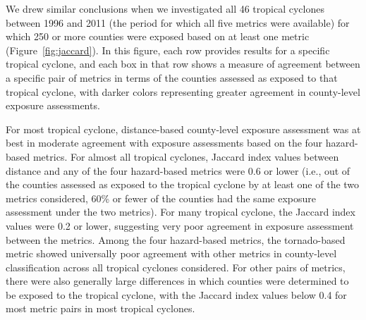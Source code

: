 We drew similar conclusions when we investigated all 46 tropical cyclones
between 1996 and 2011 (the period for which all five metrics were available)
for which 250 or more counties were exposed based on at least one metric
(Figure~\ref{fig:jaccard}). In this figure, each row provides results for a
specific tropical cyclone, and each box in that row shows a measure of
agreement between a specific pair of metrics in terms of the counties assessed
as exposed to that tropical cyclone, with darker colors representing greater
agreement in county-level exposure assessments.  

For most tropical cyclone, distance-based county-level exposure assessment was
at best in moderate agreement with exposure assessments based on the four
hazard-based metrics. For almost all tropical cyclones, Jaccard index values
between distance and any of the four hazard-based metrics were 0.6 or lower
(i.e., out of the counties assessed as exposed to the tropical cyclone by at
least one of the two metrics considered, 60\% or fewer of the counties had the
same exposure assessment under the two metrics). For many tropical cyclone, the
Jaccard index values were 0.2 or lower, suggesting very poor agreement in
exposure assessment between the metrics.  Among the four hazard-based metrics,
the tornado-based metric showed universally poor agreement with other metrics
in county-level classification across all tropical cyclones considered.  For
other pairs of metrics, there were also generally large differences in which
counties were determined to be exposed to the tropical cyclone, with the
Jaccard index values below 0.4 for most metric pairs in most tropical cyclones.

